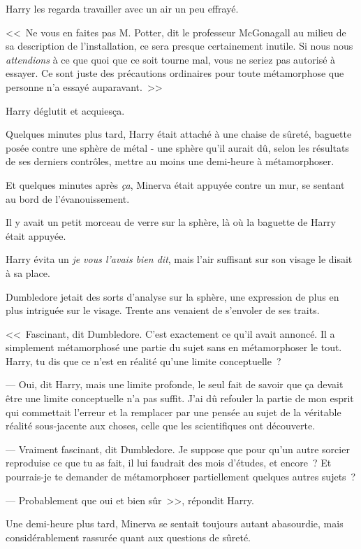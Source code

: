 Harry les regarda travailler avec un air un peu effrayé.

<<~Ne vous en faites pas M. Potter, dit le professeur McGonagall au milieu de sa description de l'installation, ce sera presque certainement inutile. Si nous nous \emph{attendions} à ce que quoi que ce soit tourne mal, vous ne seriez pas autorisé à essayer. Ce sont juste des précautions ordinaires pour toute métamorphose que personne n'a essayé auparavant.~>>

Harry déglutit et acquiesça.

Quelques minutes plus tard, Harry était attaché à une chaise de sûreté, baguette posée contre une sphère de métal - une sphère qu'il aurait dû, selon les résultats de ses derniers contrôles, mettre au moins une demi-heure à métamorphoser.

Et quelques minutes après \emph{ça}, Minerva était appuyée contre un mur, se sentant au bord de l'évanouissement.

Il y avait un petit morceau de verre sur la sphère, là où la baguette de Harry était appuyée.

Harry évita un \emph{je vous l'avais bien dit}, mais l'air suffisant sur son visage le disait à sa place.

Dumbledore jetait des sorts d'analyse sur la sphère, une expression de plus en plus intriguée sur le visage. Trente ans venaient de s'envoler de ses traits.

<<~Fascinant, dit Dumbledore. C'est exactement ce qu'il avait annoncé. Il a simplement métamorphosé une partie du sujet sans en métamorphoser le tout. Harry, tu dis que ce n'est en réalité qu'une limite conceptuelle~?

--- Oui, dit Harry, mais une limite profonde, le seul fait de savoir que ça devait être une limite conceptuelle n'a pas suffit. J'ai dû refouler la partie de mon esprit qui commettait l'erreur et la remplacer par une pensée au sujet de la véritable réalité sous-jacente aux choses, celle que les scientifiques ont découverte.

--- Vraiment fascinant, dit Dumbledore. Je suppose que pour qu'un autre sorcier reproduise ce que tu as fait, il lui faudrait des mois d'études, et encore~? Et pourrais-je te demander de métamorphoser partiellement quelques autres sujets~?

--- Probablement que oui et bien sûr~>>, répondit Harry.

Une demi-heure plus tard, Minerva se sentait toujours autant abasourdie, mais considérablement rassurée quant aux questions de sûreté.

